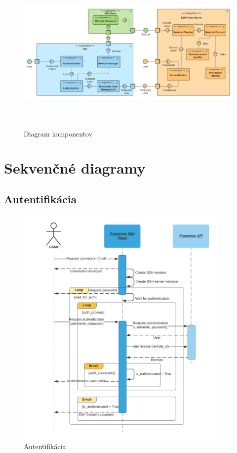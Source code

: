 \begin{figure}[H]
\begin{center}\includegraphics[width=\textwidth,height=8cm,keepaspectratio=true]{assets/diagram_komponentov.png}\end{center}
\caption[Diagram komponentov]{Diagram komponentov}\label{fig:obr_9}
\end{figure}

\section{Sekvenčné diagramy}\label{sec:sekvencne-diagramy}

\subsection{Autentifikácia}\label{subsec:sek-autentifikacia}

\begin{figure}[H]
\begin{center}\includegraphics[width=\textwidth,height=12cm,keepaspectratio=true]{assets/sequence_diagram_auth.png}\end{center}
\caption[Autentifikácia]{Autentifikácia}\label{fig:obr_10}
\end{figure}

